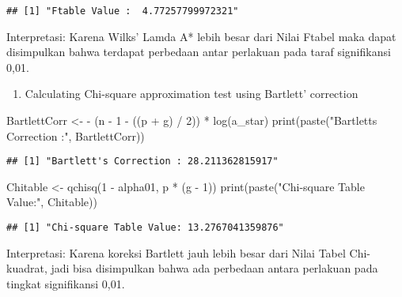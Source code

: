 \documentclass[
]{article}
\newenvironment{Shaded}{\begin{snugshade}}{\end{snugshade}}
\newcommand{\DecValTok}[1]{\textcolor[rgb]{0.00,0.00,0.81}{#1}}
\newcommand{\FunctionTok}[1]{\textcolor[rgb]{0.00,0.00,0.00}{#1}}
\newcommand{\NormalTok}[1]{#1}
\newcommand{\OtherTok}[1]{\textcolor[rgb]{0.56,0.35,0.01}{#1}}
\newcommand{\SpecialCharTok}[1]{\textcolor[rgb]{0.00,0.00,0.00}{#1}}
\newcommand{\StringTok}[1]{\textcolor[rgb]{0.31,0.60,0.02}{#1}}
\providecommand{\tightlist}{%
  \setlength{\itemsep}{0pt}\setlength{\parskip}{0pt}}
\begin{document}
\begin{verbatim}
## [1] "Ftable Value :  4.77257799972321"
\end{verbatim}

Interpretasi: Karena Wilks' Lamda A* lebih besar dari Nilai Ftabel maka
dapat disimpulkan bahwa terdapat perbedaan antar perlakuan pada taraf
signifikansi 0,01.

\begin{enumerate}
\def\labelenumi{(\arabic{enumi})}
\setcounter{enumi}{1}
\tightlist
\item
  Calculating Chi-square approximation test using Bartlett' correction
\end{enumerate}

\begin{Shaded}
\begin{Highlighting}[]
\NormalTok{BartlettCorr }\OtherTok{\textless{}{-}} \SpecialCharTok{{-}}\NormalTok{ (n }\SpecialCharTok{{-}} \DecValTok{1} \SpecialCharTok{{-}}\NormalTok{ ((p }\SpecialCharTok{+}\NormalTok{ g) }\SpecialCharTok{/} \DecValTok{2}\NormalTok{)) }\SpecialCharTok{*} \FunctionTok{log}\NormalTok{(a\_star)}
\FunctionTok{print}\NormalTok{(}\FunctionTok{paste}\NormalTok{(}\StringTok{"Bartlett\textquotesingle{}s Correction :"}\NormalTok{, BartlettCorr))}
\end{Highlighting}
\end{Shaded}

\begin{verbatim}
## [1] "Bartlett's Correction : 28.211362815917"
\end{verbatim}

\begin{Shaded}
\begin{Highlighting}[]
\NormalTok{Chitable }\OtherTok{\textless{}{-}} \FunctionTok{qchisq}\NormalTok{(}\DecValTok{1} \SpecialCharTok{{-}}\NormalTok{ alpha01, p }\SpecialCharTok{*}\NormalTok{ (g }\SpecialCharTok{{-}} \DecValTok{1}\NormalTok{))}
\FunctionTok{print}\NormalTok{(}\FunctionTok{paste}\NormalTok{(}\StringTok{"Chi{-}square Table Value:"}\NormalTok{, Chitable))}
\end{Highlighting}
\end{Shaded}

\begin{verbatim}
## [1] "Chi-square Table Value: 13.2767041359876"
\end{verbatim}

Interpretasi: Karena koreksi Bartlett jauh lebih besar dari Nilai Tabel
Chi-kuadrat, jadi bisa disimpulkan bahwa ada perbedaan antara perlakuan
pada tingkat signifikansi 0,01.
\end{document}
